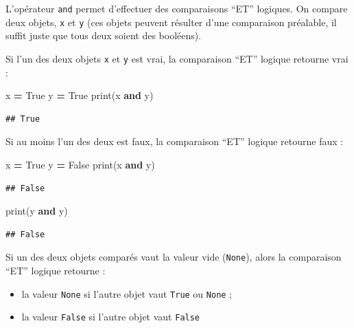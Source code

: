 \documentclass[12pt,]{book}
\newenvironment{Shaded}{\begin{snugshade}}{\end{snugshade}}
\newcommand{\KeywordTok}[1]{\textcolor[rgb]{0.13,0.29,0.53}{\textbf{#1}}}
\newcommand{\VariableTok}[1]{\textcolor[rgb]{0.00,0.00,0.00}{#1}}
\newcommand{\OperatorTok}[1]{\textcolor[rgb]{0.81,0.36,0.00}{\textbf{#1}}}
\newcommand{\BuiltInTok}[1]{#1}
\newcommand{\NormalTok}[1]{#1}
\providecommand{\tightlist}{%
  \setlength{\itemsep}{0pt}\setlength{\parskip}{0pt}}
\numberwithin{equation}{section}
\numberwithin{countremarque}{section}
\begin{document}
L'opérateur \texttt{and} permet d'effectuer des comparaisons ``ET''
logiques. On compare deux objets, \texttt{x} et \texttt{y} (ces objets
peuvent résulter d'une comparaison préalable, il suffit juste que tous
deux soient des booléens).

Si l'un des deux objets \texttt{x} et \texttt{y} est vrai, la
comparaison ``ET'' logique retourne vrai :

\begin{Shaded}
\begin{Highlighting}[]
\NormalTok{x }\OperatorTok{=} \VariableTok{True}
\NormalTok{y }\OperatorTok{=} \VariableTok{True}
\BuiltInTok{print}\NormalTok{(x }\KeywordTok{and}\NormalTok{ y)}
\end{Highlighting}
\end{Shaded}

\begin{lstlisting}
## True
\end{lstlisting}

Si au moins l'un des deux est faux, la comparaison ``ET'' logique
retourne faux :

\begin{Shaded}
\begin{Highlighting}[]
\NormalTok{x }\OperatorTok{=} \VariableTok{True}
\NormalTok{y }\OperatorTok{=} \VariableTok{False}
\BuiltInTok{print}\NormalTok{(x }\KeywordTok{and}\NormalTok{ y)}
\end{Highlighting}
\end{Shaded}

\begin{lstlisting}
## False
\end{lstlisting}

\begin{Shaded}
\begin{Highlighting}[]
\BuiltInTok{print}\NormalTok{(y }\KeywordTok{and}\NormalTok{ y)}
\end{Highlighting}
\end{Shaded}

\begin{lstlisting}
## False
\end{lstlisting}

Si un des deux objets comparés vaut la valeur vide (\texttt{None}),
alors la comparaison ``ET'' logique retourne :

\begin{itemize}
\tightlist
\item
  la valeur \texttt{None} si l'autre objet vaut \texttt{True} ou
  \texttt{None} ;
\item
  la valeur \texttt{False} si l'autre objet vaut \texttt{False}
\end{itemize}
\end{document}
